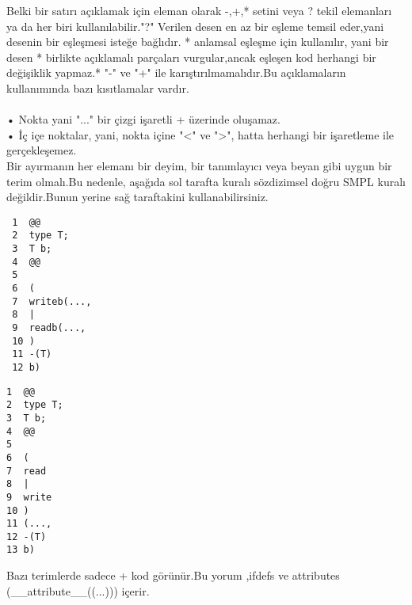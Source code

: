 \documentclass[22pt]{article}
\begin{document}
\null
Belki bir satırı açıklamak için eleman olarak  {-,+,*} setini veya ? tekil elemanları ya da her biri kullanılabilir."?" Verilen desen en az bir eşleme temsil eder,yani desenin bir eşleşmesi isteğe bağlıdır. * anlamsal eşleşme için kullanılır, yani bir desen * birlikte açıklamalı parçaları vurgular,ancak eşleşen kod herhangi bir değişiklik yapmaz.* "-" ve "+" ile karıştırılmamalıdır.Bu açıklamaların kullanımında bazı kısıtlamalar vardır.\\
\\
• Nokta yani "..." bir çizgi işaretli + üzerinde oluşamaz.\\
• İç içe noktalar, yani, nokta içine "<" ve ">", hatta herhangi bir işaretleme ile gerçekleşemez.\\
Bir ayırmanın her elemanı bir deyim, bir tanımlayıcı veya beyan gibi uygun bir terim olmalı.Bu nedenle, aşağıda sol tarafta kuralı sözdizimsel doğru SMPL kuralı değildir.Bunun yerine sağ taraftakini kullanabilirsiniz.
\begin{multicols}{2}
\begin{lstlisting}
 1  @@    
 2  type T;      
 3  T b;         
 4  @@           
 5               
 6  (            
 7  writeb(...,  
 8  |            
 9  readb(...,   
 10 )            
 11 -(T)         
 12 b) 
\end{lstlisting}
\columnbreak
\begin{lstlisting}
1  @@
2  type T;
3  T b;
4  @@
5
6  (
7  read
8  |
9  write
10 )
11 (...,
12 -(T)
13 b)
\end{lstlisting}
\end{multicols}
Bazı terimlerde sadece + kod görünür.Bu yorum ,ifdefs ve attributes (\_\_attribute\_\_((...))) içerir.
\end{document}
